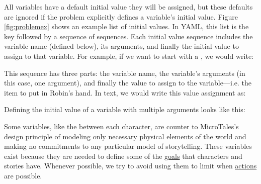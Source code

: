 \documentclass{nilreport}
\begin{document}
All variables have a default initial value they will be assigned, but these defaults are ignored if the problem explicitly defines a variable's initial value. Figure \ref{fig:problemex} shows an example list of initial values. In YAML, this list is the key  followed by a sequence of sequences. Each initial value sequence includes the variable name (defined below), its arguments, and finally the initial value to assign to that variable. For example, if we want  to start with a , we would write:

\centerline{}

\noindent This sequence has three parts: the variable name, the variable's arguments (in this case, one argument), and finally the value to assign to the variable---i.e. the item to put in Robin's  hand. In text, we would write this value assignment as:

\centerline{}

\noindent Defining the initial value of a variable with multiple arguments looks like this:

\centerline{}

Some variables, like the  between each character, are counter to MicroTales's design principle of modeling only necessary physical elements of the world and making no commitments to any particular model of storytelling. These variables exist because they are needed to define some of the \hyperref[sec:goals]{goals} that characters and stories have. Whenever possible, we try to avoid using them to limit when \hyperref[sec:actions]{actions} are possible.

\end{document}
